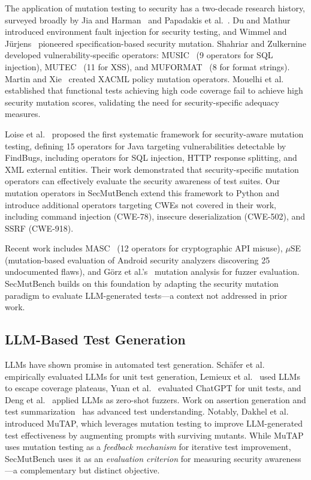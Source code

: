 \documentclass[sigconf,review,anonymous]{acmart}
\begin{document}
The application of mutation testing to security has a two-decade research history, surveyed broadly by Jia and Harman~\cite{jia2011analysis} and Papadakis et al.~\cite{papadakis2019mutation}. Du and Mathur~\cite{du2000testing} introduced environment fault injection for security testing, and Wimmel and J\"{u}rjens~\cite{wimmel2002specification} pioneered specification-based security mutation. Shahriar and Zulkernine developed vulnerability-specific operators: MUSIC~\cite{shahriar2008music} (9 operators for SQL injection), MUTEC~\cite{shahriar2009mutec} (11 for XSS), and MUFORMAT~\cite{shahriar2008muformat} (8 for format strings). Martin and Xie~\cite{martin2007xacml} created XACML policy mutation operators. Mouelhi et al.~\cite{mouelhi2007mutation} established that functional tests achieving high code coverage fail to achieve high security mutation scores, validating the need for security-specific adequacy measures.

Loise et al.~\cite{loise2017security} proposed the first systematic framework for security-aware mutation testing, defining 15 operators for Java targeting vulnerabilities detectable by FindBugs, including operators for SQL injection, HTTP response splitting, and XML external entities. Their work demonstrated that security-specific mutation operators can effectively evaluate the security awareness of test suites. Our mutation operators in SecMutBench extend this framework to Python and introduce additional operators targeting CWEs not covered in their work, including command injection (CWE-78), insecure deserialization (CWE-502), and SSRF (CWE-918).

Recent work includes MASC~\cite{ami2023masc} (12 operators for cryptographic API misuse), $\mu$SE~\cite{bonett2018muse} (mutation-based evaluation of Android security analyzers discovering 25 undocumented flaws), and G{\"o}rz et al.'s~\cite{gorz2023mutation} mutation analysis for fuzzer evaluation. SecMutBench builds on this foundation by adapting the security mutation paradigm to evaluate LLM-generated tests---a context not addressed in prior work.

\subsection{LLM-Based Test Generation}

LLMs have shown promise in automated test generation. Sch\"{a}fer et al.~\cite{schafer2024empirical} empirically evaluated LLMs for unit test generation, Lemieux et al.~\cite{lemieux2023codamosa} used LLMs to escape coverage plateaus, Yuan et al.~\cite{yuan2024no} evaluated ChatGPT for unit tests, and Deng et al.~\cite{deng2023large} applied LLMs as zero-shot fuzzers. Work on assertion generation and test summarization~\cite{nashid2024assertion} has advanced test understanding. Notably, Dakhel et al.~\cite{dakhel2023mutap} introduced MuTAP, which leverages mutation testing to improve LLM-generated test effectiveness by augmenting prompts with surviving mutants. While MuTAP uses mutation testing as a \emph{feedback mechanism} for iterative test improvement, SecMutBench uses it as an \emph{evaluation criterion} for measuring security awareness---a complementary but distinct objective.
\end{document}
